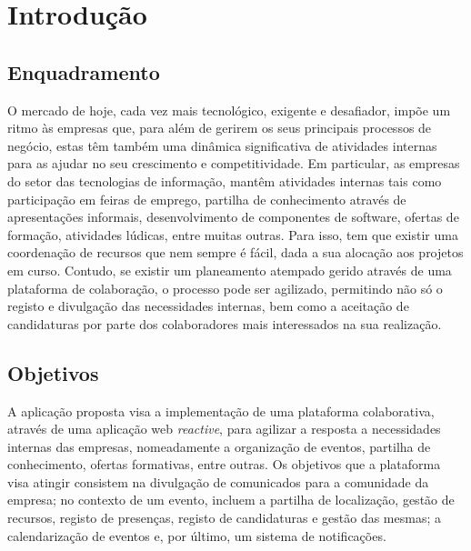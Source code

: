 \chapter{Introdução}\label{sec:intro}

\section{Enquadramento}\label{sec:enquadramento}
O mercado de hoje, cada vez mais tecnológico, exigente e desafiador, impõe um ritmo às empresas que, para
além de gerirem os seus principais processos de negócio, estas têm também uma dinâmica significativa de
atividades internas para as ajudar no seu crescimento e competitividade. Em particular, as empresas do setor
das tecnologias de informação, mantêm atividades internas tais como participação em feiras de emprego,
partilha de conhecimento através de apresentações informais, desenvolvimento de componentes de software,
ofertas de formação, atividades lúdicas, entre muitas outras. Para isso, tem que existir uma coordenação de
recursos que nem sempre é fácil, dada a sua alocação aos projetos em curso. Contudo, se existir um
planeamento atempado gerido através de uma plataforma de colaboração, o processo pode ser agilizado,
permitindo não só o registo e divulgação das necessidades internas, bem como a aceitação de candidaturas por
parte dos colaboradores mais interessados na sua realização.

\section{Objetivos}\label{sec:objectivos}
A aplicação proposta visa a implementação de uma plataforma colaborativa, através de uma aplicação web \textit{reactive}, para agilizar a resposta a necessidades internas das empresas, nomeadamente a
organização de eventos, partilha de conhecimento, ofertas formativas, entre outras. 
Os objetivos que a plataforma visa atingir consistem na divulgação de comunicados para a comunidade da empresa;
no contexto de um evento, incluem a partilha de localização, 
gestão de recursos, registo de presenças, registo de candidaturas e gestão das mesmas; 
a calendarização de eventos e, por último, um sistema de notificações.